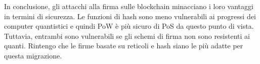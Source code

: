 In conclusione, gli attacchi alla firma sulle blockchain minacciano i loro vantaggi in termini di sicurezza. Le funzioni di hash sono meno vulnerabili ai progressi dei computer quantistici e quindi PoW è più sicuro di PoS da questo punto di vista. Tuttavia, entrambi sono vulnerabili se gli schemi di firma non sono resistenti ai quanti. Rintengo che le firme basate su reticoli e hash siano le più adatte per questa migrazione.